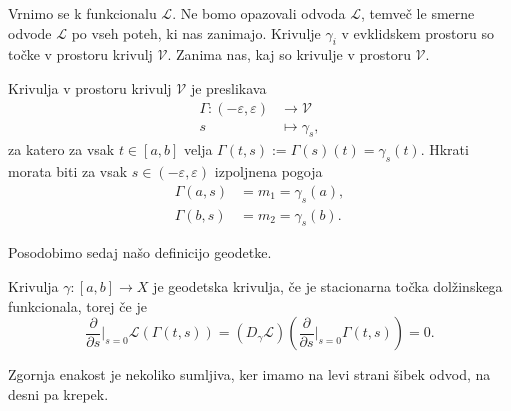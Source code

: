 Vrnimo se k funkcionalu $\mathcal{L}$. Ne bomo opazovali odvoda $\mathcal{L}$, temveč le smerne odvode $\mathcal{L}$ po vseh poteh, ki nas zanimajo. Krivulje $\gamma_i$ v evklidskem prostoru so točke v prostoru krivulj $\mathcal{V}$. Zanima nas,
kaj so krivulje v prostoru $\mathcal{V}$.

\begin{definicija}
\label{def_krivulja_v_prostoru_krivulj}
Krivulja v prostoru krivulj $\mathcal{V}$ je preslikava \begin{align*}
    \Gamma : (-\varepsilon, \varepsilon) &\longrightarrow \mathcal{V} \\
    s &\longmapsto \gamma_s,
\end{align*}
za katero za vsak $t \in  [a,b]$ velja $\Gamma(t,s) := \Gamma(s)(t) = \gamma_s(t)$. Hkrati morata biti za vsak $s \in (-\varepsilon, \varepsilon)$ izpoljnena pogoja \begin{align*}
    \Gamma(a,s) &= m_1 = \gamma_s(a), \\
    \Gamma(b,s) &= m_2 = \gamma_s(b).
\end{align*}
\end{definicija}

Posodobimo sedaj našo definicijo geodetke.

\begin{definicija}
\label{def_posodobljne_geodetkse_krivulje}
Krivulja $\gamma : [a,b] \to  X$ je geodetska krivulja, če je stacionarna točka dolžinskega funkcionala, torej če je \begin{equation*}
\frac{ \partial  }{ \partial s} \bigg|_{s = 0} \mathcal{L}(\Gamma(t,s)) = (D_\gamma \mathcal{L}) \left( \frac{ \partial  }{ \partial s} \bigg|_{s = 0} \Gamma(t,s) \right) = 0 . 
\end{equation*}    
\end{definicija}

\begin{opomba}
Zgornja enakost je nekoliko sumljiva, ker imamo na levi strani šibek odvod, na desni pa krepek.
\end{opomba}


